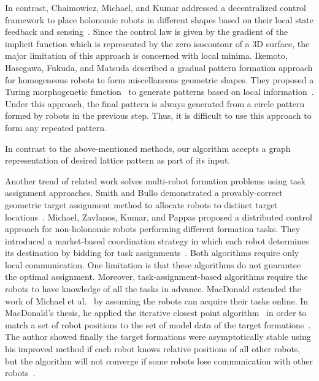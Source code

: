 In contrast, Chaimowicz, Michael, and Kumar addressed a decentralized control
framework to place holonomic robots in different shapes based on their local
state feedback and sensing~\cite{ChaMicKum05}. 
%
Since the control law is given by the gradient of the implicit function which is represented by the zero isocontour of a 3D surface, the major limitation of this approach is concerned with local minima. 
%
Ikemoto, Hasegawa, Fukuda, and Matsuda described a gradual pattern formation approach for homogeneous robots to form miscellaneous geometric shapes.
They proposed a Turing morphogenetic function~\cite{Turing37} to generate patterns based on local information~\cite{IkeHasFukMat05}. 
%
Under this approach, the final pattern is always generated from a circle pattern formed by robots in the
previous step. Thus, it is difficult to use this approach to form any repeated
pattern.


In contrast to the above-mentioned methods, our algorithm accepts a graph
representation of desired lattice pattern as part of its input.


Another trend of related work solves multi-robot formation problems using task
assignment approaches. 
%
Smith and Bullo demonstrated a provably-correct geometric target assignment method to allocate robots to distinct target locations~\cite{SmiBul07}.  
%
Michael, Zavlanos, Kumar, and Pappas proposed a distributed control approach for non-holonomic robots performing different formation tasks.  
%
They introduced a market-based coordination strategy in which each robot determines its destination by bidding for task assignments~\cite{MicZavKumPap08}.  
%
Both algorithms require only local communication. 
%
One limitation is that these algorithms do not guarantee the optimal assignment. 
%
Moreover, task-assignment-based algorithms require the robots to have knowledge of all the tasks in advance.  
%
MacDonald extended the work of Michael et al.~\cite{MicZavKumPap08} by assuming the robots can acquire their
tasks online.  
%
In MacDonald's thesis, he applied the iterative closest point algorithm~\cite{RusLev01} in order to match a set of
robot positions to the set of model data of the target formations~\cite{Mac11}.  
%
The author showed finally the target formations were asymptotically stable using his improved method if each robot knows relative positions of all other robots, but the algorithm will not converge if
some robots lose communication with other robots~\cite{Mac11}.


